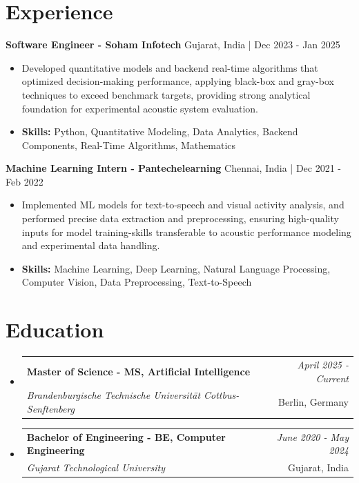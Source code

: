 \documentclass[a4paper,11pt]{article}
\makeatletter
\newcommand{\resumeSubheading}[4]{
\vspace{0.5mm}\item
    \begin{tabular*}{\linewidth}[t]{l@{\extracolsep{\fill}}r}
        \textbf{#1} & \textit{\footnotesize{#4}} \\
        \textit{\footnotesize{#3}} &  \footnotesize{#2}\\
    \end{tabular*}
    \vspace{-2.4mm}
}
\makeatother
\begin{document}
\section{\textbf{Experience}}


\vspace{1mm}
  \textbf{Software Engineer - Soham Infotech} \hfill Gujarat, India | Dec 2023 - Jan 2025
\vspace{-1.5mm} %
\begin{itemize}
  \item Developed quantitative models and backend real-time algorithms that optimized decision-making performance, applying black-box and gray-box techniques to exceed benchmark targets, providing strong analytical foundation for experimental acoustic system evaluation.

\vspace{-2mm}
  \item \textbf{Skills:} Python, Quantitative Modeling, Data Analytics, Backend Components, Real-Time Algorithms, Mathematics
\end{itemize}

\vspace{1mm}
  \textbf{Machine Learning Intern - Pantechelearning} \hfill Chennai, India | Dec 2021 - Feb 2022
\vspace{-1.5mm} %
\begin{itemize}
  \item Implemented ML models for text-to-speech and visual activity analysis, and performed precise data extraction and preprocessing, ensuring high-quality inputs for model training-skills transferable to acoustic performance modeling and experimental data handling.
\vspace{-2mm}
  \item \textbf{Skills:} Machine Learning, Deep Learning, Natural Language Processing, Computer Vision, Data Preprocessing, Text-to-Speech
\end{itemize}\section{\textbf{Education}}
\vspace{-0.4mm}

\begin{itemize}[leftmargin=0.15in, label={}]
\resumeSubheading
{Master of Science - MS, Artificial Intelligence }{Berlin, Germany}
{Brandenburgische Technische Universität Cottbus-Senftenberg  }{April 2025 - Current}

\vspace{1.0mm} %
\resumeSubheading
{Bachelor of Engineering - BE, Computer Engineering  }{Gujarat, India}
{Gujarat Technological University }{June 2020 - May 2024}

\end{itemize}
\end{document}
